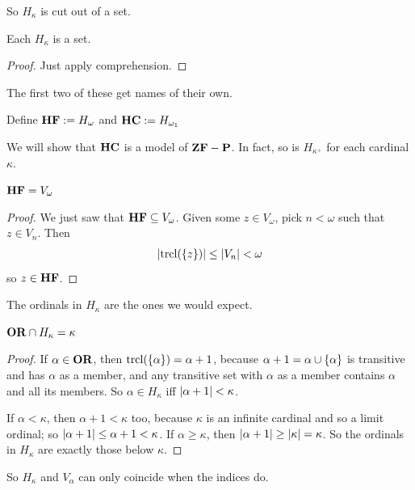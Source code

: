 So $H_{\kappa}$ is cut out of a set.

\begin{boxcorollary}
    Each $H_{\kappa}$ is a set.
\end{boxcorollary}
\begin{proof}
    Just apply comprehension.
\end{proof}

The first two of these get names of their own.

\begin{boxdefinition}
    Define $\mathbf{HF} := H_{\omega}$ and $\mathbf{HC} := H_{\omega_1}$
\end{boxdefinition}

We will show that $\mathbf{HC}$ is a model of $\mathbf{ZF} - \mathbf{P}$. In fact, so is $H_{\kappa^+}$ for each cardinal $\kappa$.

\begin{boxlemma}
    $\mathbf{HF} = V_{\omega}$
\end{boxlemma}
\begin{proof}
    We just saw that $\mathbf{HF} \subseteq V_{\omega}$. Given some $z \in V_{\omega}$, pick $n < \omega$ such that $z \in V_n$. Then
    \begin{align*}
        \left\lvert \operatorname{trcl}\!\left( \left\{ z \right\} \right) \right\rvert \leq \left\lvert V_n \right\rvert < \omega
    \end{align*}
    so $z \in \mathbf{HF}$.
\end{proof}

The ordinals in $H_{\kappa}$ are the ones we would expect.

\begin{boxlemma}
    $\mathbf{OR} \cap H_{\kappa} = \kappa$
\end{boxlemma}
\begin{proof}
    If $\alpha \in \mathbf{OR}$, then $\operatorname{trcl}\!\left( \left\{ \alpha \right\} \right) = \alpha + 1$, because $\alpha + 1 = \alpha \cup \left\{ \alpha \right\}$ is transitive and has $\alpha$ as a member, and any transitive set with $\alpha$ as a member contains $\alpha$ and all its members. So $\alpha \in H_{\kappa}$ iff $\left\lvert \alpha + 1 \right\rvert < \kappa$.

    If $\alpha < \kappa$, then $\alpha + 1 < \kappa$ too, because $\kappa$ is an infinite cardinal and so a limit ordinal; so $\left\lvert \alpha + 1 \right\rvert \leq \alpha + 1 < \kappa$. If $\alpha \geq \kappa$, then $\left\lvert \alpha + 1 \right\rvert \geq \left\lvert \kappa \right\rvert = \kappa$. So the ordinals in $H_{\kappa}$ are exactly those below $\kappa$.
\end{proof}

So $H_{\kappa}$ and $V_{\alpha}$ can only coincide when the indices do.

